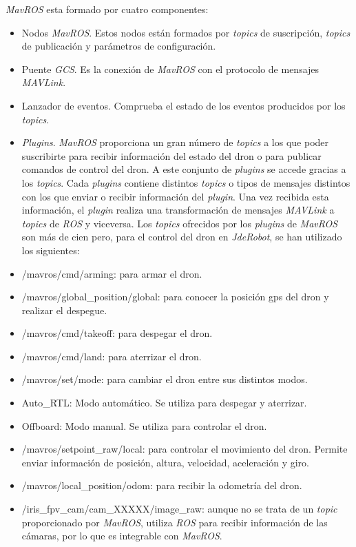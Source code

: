 \textit{MavROS} esta formado por cuatro componentes:
\begin{itemize}
    \item Nodos \textit{MavROS}. Estos nodos están formados por \textit{topics} de suscripción, \textit{topics} de publicación y parámetros de configuración.
    \item Puente \textit{GCS}. Es la conexión de \textit{MavROS} con el protocolo de mensajes \textit{MAVLink}.
    \item Lanzador de eventos. Comprueba el estado de los eventos producidos por los \textit{topics}.
    \item \textit{Plugins}. \textit{MavROS} proporciona un gran número de \textit{topics} a los que poder suscribirte para recibir información del estado del dron o para publicar comandos de control del dron. A este conjunto de \textit{plugins} se accede gracias a los \textit{topics}. Cada \textit{plugins} contiene distintos \textit{topics} o tipos de mensajes distintos con los que enviar o recibir información del \textit{plugin}. Una vez recibida esta información, el \textit{plugin} realiza una transformación de mensajes \textit{MAVLink} a \textit{topics} de \textit{ROS} y viceversa.  Los \textit{topics} ofrecidos por los \textit{plugins} de \textit{MavROS} son más de cien pero, para el control del dron en \textit{JdeRobot}, se han utilizado los siguientes:
        \item /mavros/cmd/arming: para armar el dron.
        \item /mavros/global\_position/global: para conocer la posición gps del dron y realizar el despegue.
        \item /mavros/cmd/takeoff: para despegar el dron.
        \item /mavros/cmd/land: para aterrizar el dron.
        \item /mavros/set/mode: para cambiar el dron entre sus distintos modos.
            \item Auto\_RTL: Modo automático. Se utiliza para despegar y aterrizar.
            \item Offboard: Modo manual. Se utiliza para controlar el dron.
        \item /mavros/setpoint\_raw/local: para controlar el movimiento del dron. Permite enviar información de posición, altura, velocidad, aceleración y giro. 
        \item /mavros/local\_position/odom: para recibir la odometría del dron.
        \item /iris\_fpv\_cam/cam\_XXXXX/image\_raw: aunque no se trata de un \textit{topic} proporcionado por \textit{MavROS}, utiliza \textit{ROS} para recibir información de las cámaras, por lo que es integrable con \textit{MavROS}.
\end{itemize}

